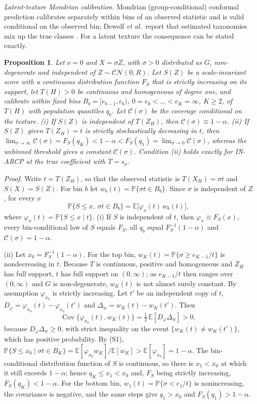 \documentclass[10pt]{article}
\newtheorem{propS}{Proposition}
\begin{document}
\emph{Latent-texture Mondrian calibration.} Mondrian (group-conditional) conformal prediction calibrates separately within bins of an observed statistic and is valid conditional on the observed bin; Dewolf \emph{et al.}\ report that estimated taxonomies mix up the true classes \cite{S-dewolf2025}. For a latent texture the consequence can be stated exactly.
\begin{propS}\label{prop:mondrian}
Let $\nu=0$ and $X=\sigma Z$, with $\sigma>0$ distributed as $G$, non-degenerate and independent of $Z\sim\mathcal{CN}(0,R)$. Let $S(Z)$ be a scale-invariant score with a continuous distribution function $F_S$ that is strictly increasing on its support, let $T(H)>0$ be continuous and homogeneous of degree one, and calibrate within fixed bins $B_b=[e_{b-1},e_b)$, $0=e_0<\dots<e_K=\infty$, $K\ge2$, of $T(H)$ with population quantiles $q_b$. Let $\mathcal C(\sigma)$ be the coverage conditional on the texture.
(i) If $S(Z)$ is independent of $T(Z_H)$, then $\mathcal C(\sigma)\equiv1-\alpha$.
(ii) If $S(Z)$ given $T(Z_H)=t$ is strictly stochastically decreasing in $t$, then $\lim_{\sigma\to\infty}\mathcal C(\sigma)=F_S(q_K)<1-\alpha<F_S(q_1)=\lim_{\sigma\to0}\mathcal C(\sigma)$, whereas the unbinned threshold gives a constant $\mathcal C(\sigma)$. Condition (ii) holds exactly for IN-ARCP at the true coefficient with $T=s_\rho$.
\end{propS}
\emph{Proof.}
Write $t=T(Z_H)$, so that the observed statistic is $T(X_H)=\sigma t$ and $S(X)=S(Z)$. For bin $b$ let $w_b(t)=\mathbb{P}\{\sigma t\in B_b\}$. Since $\sigma$ is independent of $Z$, for every $x$
\begin{equation}
\mathbb{P}\{S\le x,\ \sigma t\in B_b\}=\mathbb E\big[\varphi_x(t)\,w_b(t)\big],
\tag{S1}
\end{equation}
where $\varphi_x(t)=\mathbb{P}\{S\le x\mid t\}$.
(i) If $S$ is independent of $t$, then $\varphi_x\equiv F_S(x)$, every bin-conditional law of $S$ equals $F_S$, all $q_b$ equal $F_S^{-1}(1-\alpha)$ and $\mathcal C(\sigma)=1-\alpha$.

(ii) Let $x_0=F_S^{-1}(1-\alpha)$. For the top bin, $w_K(t)=\mathbb{P}\{\sigma\ge e_{K-1}/t\}$ is nondecreasing in $t$. Because $T$ is continuous, positive and homogeneous and $Z_H$ has full support, $t$ has full support on $(0,\infty)$; as $e_{K-1}/t$ then ranges over $(0,\infty)$ and $G$ is non-degenerate, $w_K(t)$ is not almost surely constant. By assumption $\varphi_{x_0}$ is strictly increasing. Let $t'$ be an independent copy of $t$, $D_\varphi=\varphi_{x_0}(t)-\varphi_{x_0}(t')$ and $\Delta_w=w_K(t)-w_K(t')$. Then
\[
\operatorname{Cov}\{\varphi_{x_0}(t),w_K(t)\}=\tfrac12\,\mathbb E[D_\varphi\Delta_w]>0,
\]
because $D_\varphi\Delta_w\ge0$, with strict inequality on the event $\{w_K(t)\ne w_K(t')\}$, which has positive probability. By (S1),
$\mathbb{P}\{S\le x_0\mid\sigma t\in B_K\}=\mathbb E[\varphi_{x_0}w_K]/\mathbb E[w_K]>\mathbb E[\varphi_{x_0}]=1-\alpha$.
The bin-conditional distribution function of $S$ is continuous, so there is $x_1<x_0$ at which it still exceeds $1-\alpha$; hence $q_K\le x_1<x_0$ and, $F_S$ being strictly increasing, $F_S(q_K)<1-\alpha$. For the bottom bin, $w_1(t)=\mathbb{P}\{\sigma<e_1/t\}$ is nonincreasing, the covariance is negative, and the same steps give $q_1>x_0$ and $F_S(q_1)>1-\alpha$.
\end{document}
